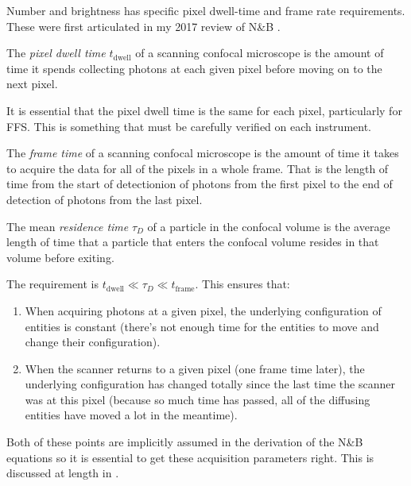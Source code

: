 \documentclass[12pt,]{book}
\providecommand{\tightlist}{%
  \setlength{\itemsep}{0pt}\setlength{\parskip}{0pt}}
\theoremstyle{definition}
\theoremstyle{definition}
\theoremstyle{definition}
\theoremstyle{remark}
\let\BeginKnitrBlock\begin \let\EndKnitrBlock\end
\begin{document}
Number and brightness has specific pixel dwell-time and frame rate
requirements. These were first articulated in my 2017 review of N\&B
\citep{NBreview}.

\BeginKnitrBlock{definition}
\protect\hypertarget{def:unnamed-chunk-15}{}{\label{def:unnamed-chunk-15}
}The \emph{pixel dwell time} \(t_\text{dwell}\) of a scanning confocal
microscope is the amount of time it spends collecting photons at each
given pixel before moving on to the next pixel.
\EndKnitrBlock{definition}

It is essential that the pixel dwell time is the same for each pixel,
particularly for FFS. This is something that must be carefully verified
on each instrument.

\BeginKnitrBlock{definition}
\protect\hypertarget{def:unnamed-chunk-16}{}{\label{def:unnamed-chunk-16}
}The \emph{frame time} of a scanning confocal microscope is the amount
of time it takes to acquire the data for all of the pixels in a whole
frame. That is the length of time from the start of detectionion of
photons from the first pixel to the end of detection of photons from the
last pixel.
\EndKnitrBlock{definition}

\BeginKnitrBlock{definition}
\protect\hypertarget{def:unnamed-chunk-17}{}{\label{def:unnamed-chunk-17}
}The mean \emph{residence time} \(\tau_D\) of a particle in the confocal
volume is the average length of time that a particle that enters the
confocal volume resides in that volume before exiting.
\EndKnitrBlock{definition}

The requirement is \(t_\text{dwell} \ll \tau_D \ll t_\text{frame}\).
This ensures that:

\begin{enumerate}
\def\labelenumi{\arabic{enumi}.}
\tightlist
\item
  When acquiring photons at a given pixel, the underlying configuration
  of entities is constant (there's not enough time for the entities to
  move and change their configuration).
\item
  When the scanner returns to a given pixel (one frame time later), the
  underlying configuration has changed totally since the last time the
  scanner was at this pixel (because so much time has passed, all of the
  diffusing entities have moved a lot in the meantime).
\end{enumerate}

Both of these points are implicitly assumed in the derivation of the
N\&B equations so it is essential to get these acquisition parameters
right. This is discussed at length in \citet{NBreview}.
\end{document}
